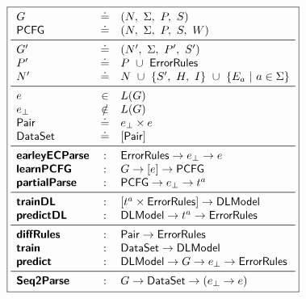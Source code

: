 \begin{figure}[t]
\small
\begin{minipage}[c]{\linewidth}
  \lstDeleteShortInline{|}
  \[
  \boxed{
  \begin{array}{lcl}
    G              & \defeq  & (N,\ \Sigma,\ P,\ S) \\
    \pcfgsym       & \defeq  & (N,\ \Sigma,\ P,\ S,\ W) \\
    \midrule
    G'             & \defeq  & (N',\ \Sigma,\ P',\ S') \\
    P'             & \defeq  & P\ \cup\ \errorrulessym \\
    N'             & \defeq  & N\ \cup\ \{S',\ H,\ I\}\ \cup\ \{E_a\ |\ a \in \Sigma\} \\
    \midrule
    e              & \in    & L(G) \\
    e_{\bot}       & \notin & L(G) \\
    \pairsym       & \defeq & e_{\bot} \times e \\
    \datasetsym    & \defeq & \List{\pairsym} \\
    \midrule
    \ecepsym       & : & \errorrulessym \to e_{\bot} \to e \\
    \learnPCFGsym  & : & G \to \List{e} \to \pcfgsym \\
    \partialsym    & : & \pcfgsym \to e_{\bot} \to t^a  \\
    \midrule
    \trainDLsym    & : & \List{t^a \times \errorrulessym} \to \Model \\
    \predictDLsym  & : & \Model \to t^a \to \errorrulessym \\
    \midrule
    \diffsym       & : & \pairsym \to \errorrulessym \\
    \trainsym      & : & \datasetsym \to \Model \\
    \predictsym    & : & \Model \to G \to e_{\bot} \to \errorrulessym \\
    \midrule
    \systemsym     & : & G \to \datasetsym \to (e_{\bot} \to e) \\
  \end{array}
  }
  \]
  \lstMakeShortInline[mathescape=true]{|}
  \label{fig:api}
\end{minipage}
\end{figure}

